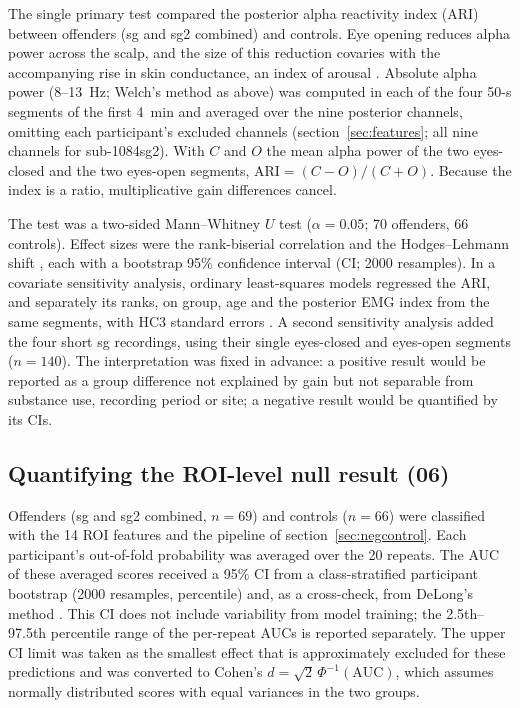 The single primary test compared the posterior alpha reactivity index (ARI) between offenders (sg and sg2 combined) and controls. Eye opening reduces alpha power across the scalp, and the size of this reduction covaries with the accompanying rise in skin conductance, an index of arousal \cite{Barry2007}. Absolute alpha power (8--13~Hz; Welch's method as above) was computed in each of the four 50-s segments of the first 4~min and averaged over the nine posterior channels, omitting each participant's excluded channels (section~\ref{sec:features}; all nine channels for sub-1084sg2). With $C$ and $O$ the mean alpha power of the two eyes-closed and the two eyes-open segments, $\mathrm{ARI} = (C - O)/(C + O)$. Because the index is a ratio, multiplicative gain differences cancel.

The test was a two-sided Mann--Whitney $U$ test ($\alpha = 0.05$; 70 offenders, 66 controls). Effect sizes were the rank-biserial correlation and the Hodges--Lehmann shift \cite{HodgesLehmann1963}, each with a bootstrap 95\% confidence interval (CI; 2000 resamples). In a covariate sensitivity analysis, ordinary least-squares models regressed the ARI, and separately its ranks, on group, age and the posterior EMG index from the same segments, with HC3 standard errors \cite{MacKinnonWhite1985}. A second sensitivity analysis added the four short sg recordings, using their single eyes-closed and eyes-open segments ($n = 140$). The interpretation was fixed in advance: a positive result would be reported as a group difference not explained by gain but not separable from substance use, recording period or site; a negative result would be quantified by its CIs.

\subsection{Quantifying the ROI-level null result (06)}
\label{sec:null}

Offenders (sg and sg2 combined, $n = 69$) and controls ($n = 66$) were classified with the 14 ROI features and the pipeline of section~\ref{sec:negcontrol}. Each participant's out-of-fold probability was averaged over the 20 repeats. The AUC of these averaged scores received a 95\% CI from a class-stratified participant bootstrap (2000 resamples, percentile) and, as a cross-check, from DeLong's method \cite{DeLong1988}. This CI does not include variability from model training; the 2.5th--97.5th percentile range of the per-repeat AUCs is reported separately. The upper CI limit was taken as the smallest effect that is approximately excluded for these predictions and was converted to Cohen's $d = \sqrt{2}\,\Phi^{-1}(\mathrm{AUC})$, which assumes normally distributed scores with equal variances in the two groups.

